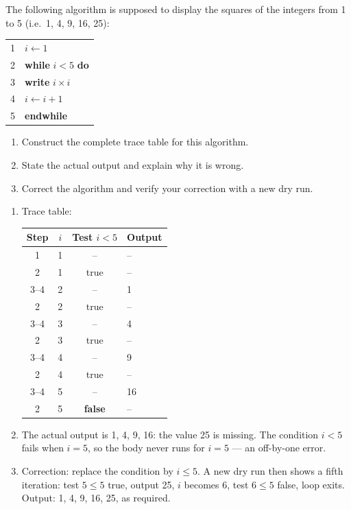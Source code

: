 \documentclass[11pt]{article}
\begin{document}
\begin{exercice}
The following algorithm is supposed to display the squares of the integers from 1 to 5 (i.e.\ 1, 4, 9, 16, 25):

\begin{center}
\begin{tabular}{ll}
1 & $i \leftarrow 1$ \\
2 & \textbf{while} $i < 5$ \textbf{do} \\
3 & \qquad \textbf{write} $i \times i$ \\
4 & \qquad $i \leftarrow i + 1$ \\
5 & \textbf{endwhile} \\
\end{tabular}
\end{center}

\begin{enumerate}
\item Construct the complete trace table for this algorithm.
\item State the actual output and explain why it is wrong.
\item Correct the algorithm and verify your correction with a new dry run.
\end{enumerate}
\end{exercice}

\begin{corrige}[Exercise 1]
\begin{enumerate}
\item Trace table:

\begin{center}
\begin{tabular}{|c|c|c|l|}
\hline
\rowcolor{popblueL} Step & $i$ & Test $i < 5$ & Output \\
\hline
1 & 1 & -- & -- \\
\hline
2 & 1 & true & -- \\
\hline
3--4 & 2 & -- & 1 \\
\hline
2 & 2 & true & -- \\
\hline
3--4 & 3 & -- & 4 \\
\hline
2 & 3 & true & -- \\
\hline
3--4 & 4 & -- & 9 \\
\hline
2 & 4 & true & -- \\
\hline
3--4 & 5 & -- & 16 \\
\hline
2 & 5 & \textbf{false} & -- \\
\hline
\end{tabular}
\end{center}

\item The actual output is 1, 4, 9, 16: the value 25 is missing. The condition $i < 5$ fails when $i = 5$, so the body never runs for $i = 5$ --- an off-by-one error.
\item Correction: replace the condition by $i \leq 5$. A new dry run then shows a fifth iteration: test $5 \leq 5$ true, output 25, $i$ becomes 6, test $6 \leq 5$ false, loop exits. Output: 1, 4, 9, 16, 25, as required.
\end{enumerate}
\end{corrige}
\end{document}
